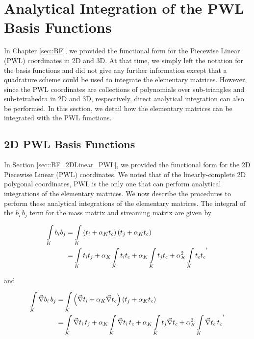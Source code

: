 \section{Analytical Integration of the PWL Basis Functions}
\label{sec::appendix_BF_PWLInt}

In Chapter \ref{sec::BF}, we provided the functional form for the Piecewise Linear (PWL) coordinates in 2D and 3D. At that time, we simply left the notation for the basis functions and did not give any further information except that a quadrature scheme could be used to integrate the elementary matrices. However, since the PWL coordinates are collections of polynomials over sub-triangles and sub-tetrahedra in 2D and 3D, respectively, direct analytical integration can also be performed. In this section, we detail how the elementary matrices can be integrated with the PWL functions.

\subsection{2D PWL Basis Functions}
\label{sec::appendix_BF_PWLInt_2D}

In Section \ref{sec::BF_2DLinear_PWL}, we provided the functional form for the 2D Piecewise Linear (PWL) coordinates. We noted that of the linearly-complete 2D polygonal coordinates, PWL is the only one that can perform analytical integrations of the elementary matrices. We now describe the procedures to perform these analytical integrations of the elementary matrices. The integral of the $b_i \, b_j$ term for the mass matrix and streaming matrix are given by 

\begin{equation}
\label{eq::App_BF_2D_triref_massterm}
\begin{aligned}
\int\displaylimits_K b_i b_j &= \int\displaylimits_K \left( t_i + \alpha_K t_c  \right) \left(  t_j + \alpha_K t_c \right) \\
&= \int\displaylimits_K t_i t_j + \alpha_K \int\displaylimits_K t_i t_c + \alpha_K \int\displaylimits_K t_j t_c + \alpha_K^2 \int\displaylimits_K t_c t_c
\end{aligned},
\end{equation}

\noindent and

\begin{equation}
\label{eq::App_BF_2D_triref_gradterm}
\begin{aligned}
\int\displaylimits_K \vec{\nabla} b_i \,  b_j &= \int\displaylimits_K \left( \vec{\nabla} t_i + \alpha_K \vec{\nabla} t_c  \right) \left(  t_j + \alpha_K t_c \right) \\
&= \int\displaylimits_K \vec{\nabla} t_i \,t_j + \alpha_K \int\displaylimits_K \vec{\nabla} t_i\, t_c + \alpha_K \int\displaylimits_K t_j \vec{\nabla} t_c + \alpha_K^2 \int\displaylimits_K \vec{\nabla} t_c \, t_c
\end{aligned} ,
\end{equation}

